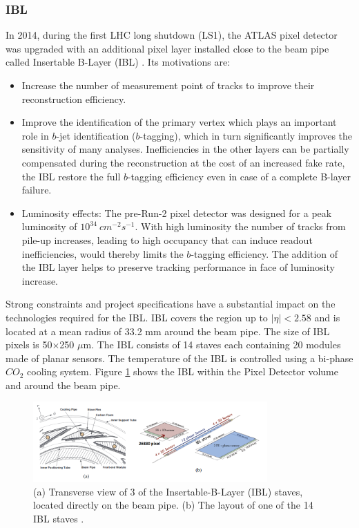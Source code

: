 \subsubsection{IBL}
\label{chap2:ATLAS:ITK:IBL}
In 2014, during the first LHC long shutdown (LS1), the ATLAS pixel detector was upgraded with an additional pixel layer installed close to the beam pipe called Insertable B-Layer (IBL) \cite{IBL_TDR}. Its motivations are:
\begin{itemize}
    \item Increase the number of measurement point of tracks to improve their reconstruction efficiency.
	\item Improve the identification of the primary vertex which plays an important role in $b$-jet identification ($b$-tagging), which in turn significantly improves the sensitivity of many analyses. Inefficiencies in the other layers can be partially compensated during the reconstruction at the cost of an increased fake rate, the IBL restore the full $b$-tagging efficiency even in case of a complete B-layer failure.
	\item Luminosity effects: The pre-Run-2 pixel detector was designed for a peak luminosity of $10^{34} \ cm^{-2}s^{-1}$. With high luminosity the number of tracks from pile-up  increases, leading to high occupancy that can induce readout inefficiencies, would thereby limits the $b$-tagging efficiency. The addition of the IBL layer helps to preserve tracking performance in face of luminosity increase.
\end{itemize}
Strong constraints and project specifications have a substantial impact on the technologies required for the IBL. IBL covers the region up to $|\eta| < 2.58$ and is located at a mean radius of 33.2 mm around the beam pipe. The size of IBL pixels is 50$\times$250 $\mu$m. The IBL consists of 14 staves each containing 20 modules made of planar sensors. The temperature of the IBL is controlled using a bi-phase $CO_2$ cooling system. Figure \ref{fig:chap2:ATLAS:ITK:IBL} shows the IBL within the Pixel Detector volume and around the beam pipe.
\begin{figure}[htbp]
    \centering
    \includegraphics[width=0.8\textwidth]{Ch2/Img/IBL.png}
    \caption{(a) Transverse view of 3 of the Insertable-B-Layer (IBL) staves, located directly on the beam pipe. (b) The layout of one of the 14 IBL staves \cite{ID_withIBL}.}
    \label{fig:chap2:ATLAS:ITK:IBL}
\end{figure}
